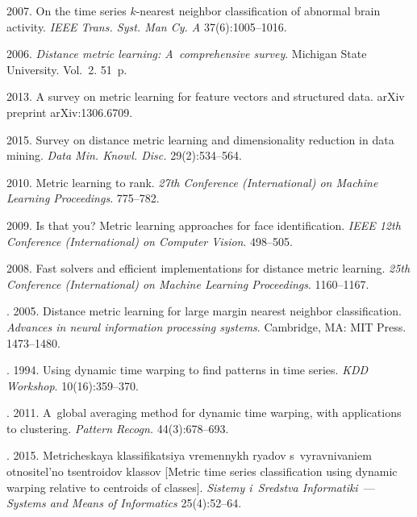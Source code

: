 \begin{multicols}{2}
{{\begin{thebibliography}{99}
2007. On the time series $k$-nearest neighbor classification of abnormal brain
  activity.
\textit{IEEE Trans. Syst. Man Cy. A}
37(6):1005--1016.



2006.
\textit{Distance metric learning: A~comprehensive survey}.
{Michigan State University}. Vol.~2. 51~p.

2013.
A survey on metric learning for feature vectors and structured data.
{arXiv preprint arXiv:1306.6709}.

2015.
Survey on distance metric learning and dimensionality reduction in data mining.
\textit{Data Min. Knowl. Disc.} 29(2):534--564.

2010.
Metric learning to rank.
\textit{27th  Conference (International) on Machine Learning Proceedings}.
775--782.

2009.
Is that you? Metric learning approaches for face identification.
\textit{IEEE 12th Conference (International) on Computer Vision}.
498--505.

2008.
Fast solvers and efficient implementations for distance metric learning.
\textit{25th  Conference (International) on Machine Learning Proceedings}.
1160--1167.

.
2005.
Distance metric learning for large margin nearest neighbor classification.
\textit{Advances in neural information processing systems}.
Cambridge, MA: MIT Press. 1473--1480.

.
1994.
Using dynamic time warping to find patterns in time series.
\textit{KDD Workshop}. 10(16):359--370.

.
2011.
A~global averaging method for dynamic time warping, with applications to
  clustering.
\textit{Pattern Recogn.} 44(3):678--693.

.
2015.
Metricheskaya klassifikatsiya vremennykh ryadov s~vyravnivaniem otnositel'no
  tsentroidov klassov [Metric time series classification using
  dynamic warping relative to centroids of classes].
\textit{Sistemy i~Sredstva Informatiki}~--- \textit{Systems and Means of Informatics}
25(4):52--64.


\end{thebibliography}}}
\end{multicols}
